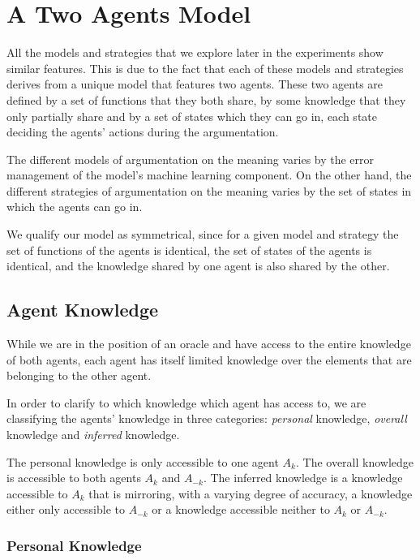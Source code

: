 \section{A Two Agents Model}\label{sec:AgentModel}

All the models and strategies that we explore later in the experiments show similar features. This is due to the fact that each of these models and strategies derives from a unique model that features two agents. These two agents are defined by a set of functions that they both share, by some knowledge that they only partially share and by a set of states which they can go in, each state deciding the agents' actions during the argumentation.

The different models of argumentation on the meaning varies by the error management of the model's machine learning component. On the other hand, the different strategies of argumentation on the meaning varies by the set of states in which the agents can go in.

We qualify our model as symmetrical, since for a given model and strategy the set of functions of the agents is identical, the set of states of the agents is identical, and the knowledge shared by one agent is also shared by the other.

\subsection{Agent Knowledge}

While we are in the position of an oracle and have access to the entire knowledge of both agents, each agent has itself limited knowledge over the elements that are belonging to the other agent.

In order to clarify to which knowledge which agent has access to, we are classifying the agents' knowledge in three categories: \emph{personal} knowledge, \emph{overall} knowledge and \emph{inferred} knowledge.

The personal knowledge is only accessible to one agent $A_{k}$. The overall knowledge is accessible to both agents $A_{k}$ and $A_{-k}$. The inferred knowledge is a knowledge accessible to $A_{k}$ that is mirroring, with a varying degree of accuracy, a knowledge either only accessible to $A_{-k}$ or a knowledge accessible neither to $A_{k}$ or $A_{-k}$.

\subsubsection{Personal Knowledge}


